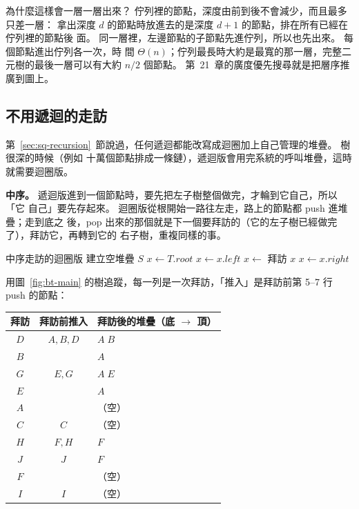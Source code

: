為什麼這樣會一層一層出來？ 佇列裡的節點，深度由前到後不會減少，而且最多只差一層：
拿出深度 $d$ 的節點時放進去的是深度 $d + 1$ 的節點，排在所有已經在佇列裡的節點後
面。 同一層裡，左邊節點的子節點先進佇列，所以也先出來。 每個節點進出佇列各一次，時
間 $\Theta(n)$；佇列最長時大約是最寬的那一層，完整二元樹的最後一層可以有大約 $n/2$
個節點。 第~21~章的廣度優先搜尋就是把層序推廣到圖上。

\subsection{不用遞迴的走訪}
\label{sec:bt-iter}

第~\ref{sec:sq-recursion}~節說過，任何遞迴都能改寫成迴圈加上自己管理的堆疊。 樹很深的時候（例如
十萬個節點排成一條鏈），遞迴版會用完系統的呼叫堆疊，這時就需要迴圈版。

\textbf{中序。} 遞迴版進到一個節點時，要先把左子樹整個做完，才輪到它自己，所以「它
自己」要先存起來。 迴圈版從根開始一路往左走，路上的節點都 push 進堆疊；走到底之
後，pop 出來的那個就是下一個要拜訪的（它的左子樹已經做完了），拜訪它，再轉到它的
右子樹，重複同樣的事。

\begin{pseudo}[label=alg:bt-inorder-iter]{中序走訪的迴圈版}
    \State 建立空堆疊 $S$
    \State $x \gets T.\mathit{root}$
         
            \State {}
            \State $x \gets x.\mathit{left}$
        \EndWhile
        \State $x \gets$  
        \State 拜訪 $x$
        \State $x \gets x.\mathit{right}$
    \EndWhile
\EndProcedure
\end{pseudo}

用圖~\ref{fig:bt-main} 的樹追蹤，每一列是一次拜訪，「推入」是拜訪前第 5--7 行
push 的節點：

\begin{center}
\begin{tabular}{ccl}
\toprule
拜訪 & 拜訪前推入 & 拜訪後的堆疊（底 $\to$ 頂）\\
\midrule
$D$ & $A, B, D$ & $A\;B$ \\
$B$ & & $A$ \\
$G$ & $E, G$ & $A\;E$ \\
$E$ & & $A$ \\
$A$ & & （空）\\
$C$ & $C$ & （空）\\
$H$ & $F, H$ & $F$ \\
$J$ & $J$ & $F$ \\
$F$ & & （空）\\
$I$ & $I$ & （空）\\
\bottomrule
\end{tabular}
\end{center}

